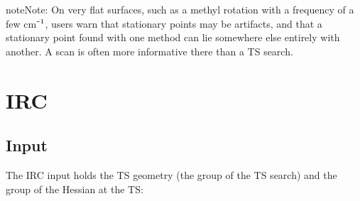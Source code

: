 \documentclass[letterpaper,10pt,english,openany,oneside]{sphinxmanual}
\begin{document}
\begin{sphinxadmonition}{note}{Note:}
\sphinxAtStartPar
On very flat surfaces, such as a methyl rotation with a frequency of a few cm⁻\(\sp{\text{1}}\), users warn that stationary points
may be artifacts, and that a stationary point found with one method can lie somewhere else entirely with another.
A scan is often more informative there than a TS search.
\end{sphinxadmonition}




\section{IRC}
\label{\detokenize{tasks/ts-irc-scan:irc}}

\subsection{Input}
\label{\detokenize{tasks/ts-irc-scan:id2}}
\sphinxAtStartPar
The IRC input holds the TS geometry (the  group of the TS search) and the  group of the Hessian at
the TS:

\begin{sphinxVerbatim}[commandchars=\\\{\}]
\end{sphinxVerbatim}
\end{document}

